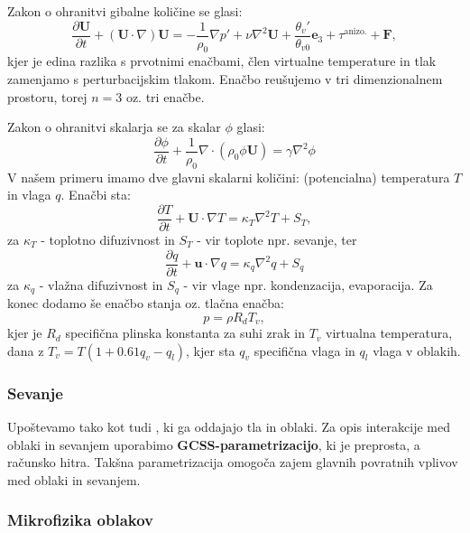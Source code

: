 \documentclass[mat2, tisk]{fmfdelo}
\begin{document}
Zakon o ohranitvi gibalne količine se glasi:
\begin{equation}
\frac{\partial \textbf{U}}{\partial t} + (\textbf{U} \cdot \nabla)\textbf{U} = -\frac{1}{\rho_0}\nabla p' + \nu \nabla^2 \textbf{U} + \frac{\theta_v'}{\theta_{v0}} \textbf{e}_3 + \tau^{\text{anizo.}} + \textbf{F},
\end{equation}
kjer je edina razlika s prvotnimi enačbami, člen virtualne temperature
in tlak zamenjamo s perturbacijskim tlakom. Enačbo reušujemo v tri dimenzionalnem prostoru, 
torej $n=3$ oz. tri enačbe. 

Zakon o ohranitvi skalarja se za skalar $\phi$ glasi:
\begin{equation}
\frac{\partial \phi}{\partial t} + \frac{1}{\rho_0}\nabla \cdot (\rho_0 \phi\textbf{U}) = \gamma \nabla^2 \phi
\end{equation}
V našem primeru imamo dve glavni skalarni količini: (potencialna) 
temperatura $T$ in vlaga $q$. Enačbi sta: 
\begin{equation}
  \frac{\partial T}{\partial t} + \mathbf{U}\cdot\nabla T
   = \kappa_T \nabla^2 T + S_T, 
\end{equation}
za $\kappa_T$ - toplotno difuzivnost in $S_T$ - vir toplote npr. sevanje, 
ter 
\begin{equation}
  \frac{\partial q}{\partial t} + \mathbf{u}\cdot\nabla q
   = \kappa_q \nabla^2 q + S_q
\end{equation}
za $\kappa_q$ - vlažna difuzivnost in $S_q$ - vir vlage npr. kondenzacija, evaporacija.
Za konec dodamo še enačbo stanja oz. tlačna enačba:
\begin{equation}
    p = \rho R_d T_v,
\end{equation}
kjer je $R_d$ specifična plinska konstanta za suhi zrak in $T_v$ virtualna temperatura, dana
z $T_v = T \left( 1 + 0.61 q_v - q_l \right)$, kjer sta $q_v$ specifična vlaga in 
$q_l$ vlaga v oblakih.

\subsubsection{Sevanje}

Upoštevamo tako  kot tudi , ki ga oddajajo tla in oblaki. 
Za opis interakcije med oblaki in sevanjem uporabimo \textbf{GCSS-parametrizacijo}, ki je preprosta, a računsko hitra. 
Takšna parametrizacija omogoča zajem glavnih povratnih vplivov med oblaki in sevanjem.

\subsubsection{Mikrofizika oblakov}
\end{document}
